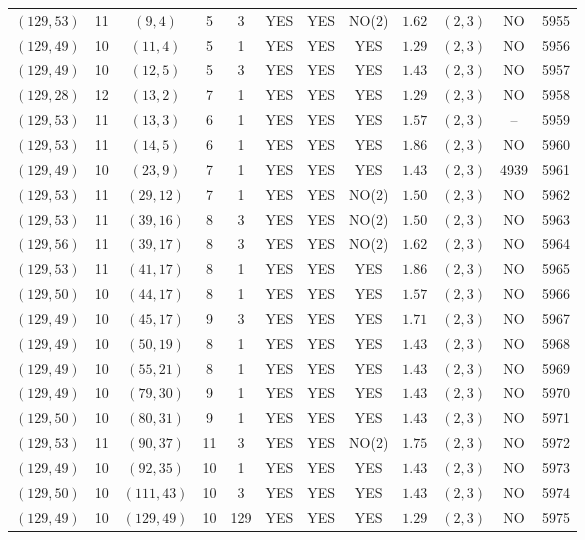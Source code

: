 \begin{longtable}{|c|c|c|c|c|c|c|c|c|c|c|c|}
$(129,53)$ & 11 & $(9,4)$ & 5 & 3 & YES & YES & NO(2) & $1.62$ & $(2,3)$ & NO & 5955\\
$(129,49)$ & 10 & $(11,4)$ & 5 & 1 & YES & YES & YES & $1.29$ & $(2,3)$ & NO & 5956\\
$(129,49)$ & 10 & $(12,5)$ & 5 & 3 & YES & YES & YES & $1.43$ & $(2,3)$ & NO & 5957\\
$(129,28)$ & 12 & $(13,2)$ & 7 & 1 & YES & YES & YES & $1.29$ & $(2,3)$ & NO & 5958\\
$(129,53)$ & 11 & $(13,3)$ & 6 & 1 & YES & YES & YES & $1.57$ & $(2,3)$ & -- & 5959\\
$(129,53)$ & 11 & $(14,5)$ & 6 & 1 & YES & YES & YES & $1.86$ & $(2,3)$ & NO & 5960\\
$(129,49)$ & 10 & $(23,9)$ & 7 & 1 & YES & YES & YES & $1.43$ & $(2,3)$ & 4939 & 5961\\
$(129,53)$ & 11 & $(29,12)$ & 7 & 1 & YES & YES & NO(2) & $1.50$ & $(2,3)$ & NO & 5962\\
$(129,53)$ & 11 & $(39,16)$ & 8 & 3 & YES & YES & NO(2) & $1.50$ & $(2,3)$ & NO & 5963\\
$(129,56)$ & 11 & $(39,17)$ & 8 & 3 & YES & YES & NO(2) & $1.62$ & $(2,3)$ & NO & 5964\\
$(129,53)$ & 11 & $(41,17)$ & 8 & 1 & YES & YES & YES & $1.86$ & $(2,3)$ & NO & 5965\\
$(129,50)$ & 10 & $(44,17)$ & 8 & 1 & YES & YES & YES & $1.57$ & $(2,3)$ & NO & 5966\\
$(129,49)$ & 10 & $(45,17)$ & 9 & 3 & YES & YES & YES & $1.71$ & $(2,3)$ & NO & 5967\\
$(129,49)$ & 10 & $(50,19)$ & 8 & 1 & YES & YES & YES & $1.43$ & $(2,3)$ & NO & 5968\\
$(129,49)$ & 10 & $(55,21)$ & 8 & 1 & YES & YES & YES & $1.43$ & $(2,3)$ & NO & 5969\\
$(129,49)$ & 10 & $(79,30)$ & 9 & 1 & YES & YES & YES & $1.43$ & $(2,3)$ & NO & 5970\\
$(129,50)$ & 10 & $(80,31)$ & 9 & 1 & YES & YES & YES & $1.43$ & $(2,3)$ & NO & 5971\\
$(129,53)$ & 11 & $(90,37)$ & 11 & 3 & YES & YES & NO(2) & $1.75$ & $(2,3)$ & NO & 5972\\
$(129,49)$ & 10 & $(92,35)$ & 10 & 1 & YES & YES & YES & $1.43$ & $(2,3)$ & NO & 5973\\
$(129,50)$ & 10 & $(111,43)$ & 10 & 3 & YES & YES & YES & $1.43$ & $(2,3)$ & NO & 5974\\
$(129,49)$ & 10 & $(129,49)$ & 10 & 129 & YES & YES & YES & $1.29$ & $(2,3)$ & NO & 5975\\

\end{longtable}
